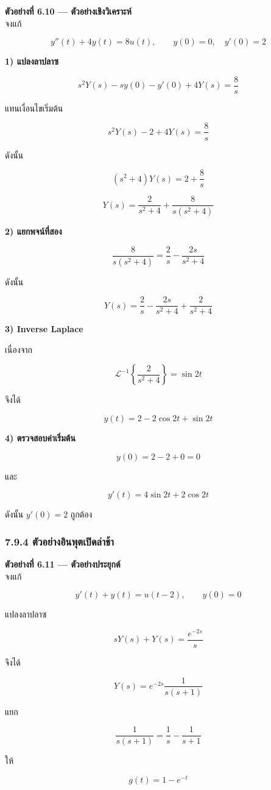 \textbf{ตัวอย่างที่ 6.10 — ตัวอย่างเชิงวิเคราะห์}\\
จงแก้

\[
y''(t)+4y(t)=8u(t),\qquad y(0)=0,\quad y'(0)=2
\]

\textbf{1) แปลงลาปลาซ}

\[
s^2Y(s)-sy(0)-y'(0)+4Y(s)=\frac{8}{s}
\]

แทนเงื่อนไขเริ่มต้น

\[
s^2Y(s)-2+4Y(s)=\frac{8}{s}
\]

ดังนั้น

\[
(s^2+4)Y(s)=2+\frac{8}{s}
\]

\[
Y(s)=\frac{2}{s^2+4}+\frac{8}{s(s^2+4)}
\]

\textbf{2) แยกพจน์ที่สอง}

\[
\frac{8}{s(s^2+4)}=\frac{2}{s}-\frac{2s}{s^2+4}
\]

ดังนั้น

\[
Y(s)=\frac{2}{s}-\frac{2s}{s^2+4}+\frac{2}{s^2+4}
\]

\textbf{3) Inverse Laplace}

เนื่องจาก

\[
\mathcal{L}^{-1}\left\{\frac{2}{s^2+4}\right\}=\sin 2t
\]

จึงได้

\[
\boxed{y(t)=2-2\cos 2t+\sin 2t}
\]

\textbf{4) ตรวจสอบค่าเริ่มต้น}

\[
y(0)=2-2+0=0
\]

และ

\[
y'(t)=4\sin 2t+2\cos 2t
\]

ดังนั้น $y'(0)=2$ ถูกต้อง

\subsubsection{7.9.4 ตัวอย่างอินพุตเปิดล่าช้า}

\textbf{ตัวอย่างที่ 6.11 — ตัวอย่างประยุกต์}\\
จงแก้

\[
y'(t)+y(t)=u(t-2),\qquad y(0)=0
\]

แปลงลาปลาซ

\[
sY(s)+Y(s)=\frac{e^{-2s}}{s}
\]

จึงได้

\[
Y(s)=e^{-2s}\frac{1}{s(s+1)}
\]

แยก

\[
\frac{1}{s(s+1)}=\frac{1}{s}-\frac{1}{s+1}
\]

ให้

\[
g(t)=1-e^{-t}
\]

